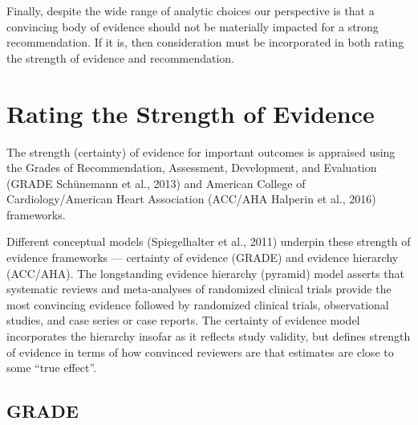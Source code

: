 \documentclass[
  letterpaper,
  DIV=11,
  numbers=noendperiod]{scrreprt}
\begin{document}
Finally, despite the wide range of analytic choices our perspective is
that a convincing body of evidence should not be materially impacted for
a strong recommendation. If it is, then consideration must be
incorporated in both rating the strength of evidence and recommendation.

\hypertarget{rating-the-strength-of-evidence}{%
\section{Rating the Strength of
Evidence}\label{rating-the-strength-of-evidence}}

The strength (certainty) of evidence for important outcomes is appraised
using the Grades of Recommendation, Assessment, Development, and
Evaluation (GRADE Schünemann et al., 2013) and American College of
Cardiology/American Heart Association (ACC/AHA Halperin et al., 2016)
frameworks.

Different conceptual models (Spiegelhalter et al., 2011) underpin these
strength of evidence frameworks --- certainty of evidence (GRADE) and
evidence hierarchy (ACC/AHA). The longstanding evidence hierarchy
(pyramid) model asserts that systematic reviews and meta-analyses of
randomized clinical trials provide the most convincing evidence followed
by randomized clinical trials, observational studies, and case series or
case reports. The certainty of evidence model incorporates the hierarchy
insofar as it reflects study validity, but defines strength of evidence
in terms of how convinced reviewers are that estimates are close to some
``true effect''.

\hypertarget{grade}{%
\subsection{GRADE}\label{grade}}
\end{document}
